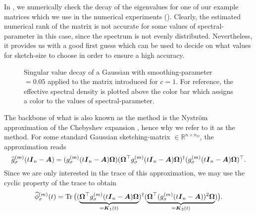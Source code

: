 In , we numerically check the decay
of the eigenvalues for one of our example matrices which we use in the numerical
experiments (). Clearly, the estimated
numerical rank of the matrix is not accurate for some values of \gls{spectral-parameter}
in this case, since the spectrum is
not evenly distributed. Nevertheless, it provides us with a good first
guess which can be used to decide on what values for \gls{sketch-size} to choose
in order to ensure a high accuracy.\\
\begin{figure}[ht]
    \centering
    
    \caption{Singular value decay of a Gaussian 
       with \gls{smoothing-parameter} $=0.05$ applied to the matrix introduced
        for $c=1$. For reference,
       the effective spectral density is plotted above the color bar which
       assigns a color to the values of \gls{spectral-parameter}.}
    \label{fig:3-nystrom-singular-value-decay}
\end{figure}

The backbone of what is also known as the  method \cite{lin2017randomized}
is the Nystr\"om approximation of the Chebyshev expansion ,
hence why we refer to it as the  method. 
For some standard Gaussian \gls{sketching-matrix} $\in \mathbb{R}^{n \times n_{\Omega}}$,
the approximation reads
\begin{equation}
    \widehat{g}_{\sigma}^{(m)}(t\boldsymbol{I}_n - \boldsymbol{A})
    = (g_{\sigma}^{(m)}(t\boldsymbol{I}_n - \boldsymbol{A}) \boldsymbol{\Omega}) (\boldsymbol{\Omega}^{\top} g_{\sigma}^{(m)}(t\boldsymbol{I}_n - \boldsymbol{A}) \boldsymbol{\Omega})^{\dagger} (g_{\sigma}^{(m)}(t\boldsymbol{I}_n - \boldsymbol{A}) \boldsymbol{\Omega})^{\top}.
    \label{equ:3-nystrom-nystrom-smoothing-kernel}
\end{equation}
Since we are only interested in the trace of this approximation,
we may use the cyclic property of the trace to obtain
\begin{equation}
    \widehat{\phi}_{\sigma}^{(m)}(t)
        = \operatorname{Tr}\big((\underbrace{\boldsymbol{\Omega}^{\top} g_{\sigma}^{(m)}(t\boldsymbol{I}_n - \boldsymbol{A}) \boldsymbol{\Omega}}_{=\boldsymbol{K}_1(t)})^{\dagger} (\underbrace{\boldsymbol{\Omega}^{\top} (g_{\sigma}^{(m)}(t\boldsymbol{I}_n - \boldsymbol{A}))^2 \boldsymbol{\Omega}}_{=\boldsymbol{K}_2(t)})\big).
    \label{equ:3-nystrom-spectral-density}
\end{equation}\\

